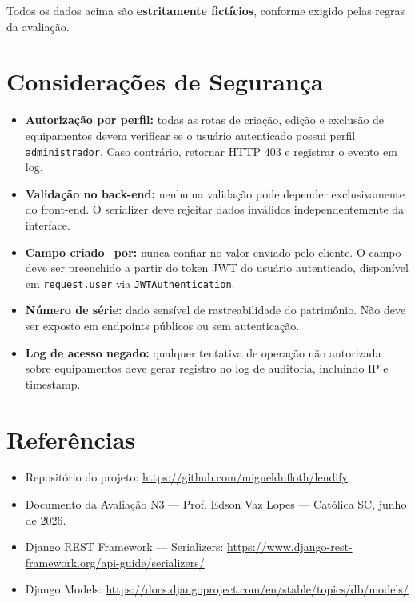 \documentclass[12pt,a4paper]{article}
\begin{document}
Todos os dados acima são \textbf{estritamente fictícios}, conforme exigido pelas
regras da avaliação.

\section{Considerações de Segurança}

\begin{itemize}
  \item \textbf{Autorização por perfil:} todas as rotas de criação, edição e exclusão
        de equipamentos devem verificar se o usuário autenticado possui perfil
        \texttt{administrador}. Caso contrário, retornar HTTP 403 e registrar o evento em log.

  \item \textbf{Validação no back-end:} nenhuma validação pode depender exclusivamente
        do front-end. O serializer deve rejeitar dados inválidos independentemente
        da interface.

  \item \textbf{Campo criado\_por:} nunca confiar no valor enviado pelo cliente.
        O campo deve ser preenchido a partir do token JWT do usuário autenticado,
        disponível em \texttt{request.user} via \texttt{JWTAuthentication}.

  \item \textbf{Número de série:} dado sensível de rastreabilidade do patrimônio.
        Não deve ser exposto em endpoints públicos ou sem autenticação.

  \item \textbf{Log de acesso negado:} qualquer tentativa de operação não autorizada
        sobre equipamentos deve gerar registro no log de auditoria, incluindo IP
        e timestamp.
\end{itemize}

\section{Referências}

\begin{itemize}
  \item Repositório do projeto: \url{https://github.com/migueldufloth/lendify}
  \item Documento da Avaliação N3 — Prof. Edson Vaz Lopes — Católica SC, junho de 2026.
  \item Django REST Framework — Serializers: \url{https://www.django-rest-framework.org/api-guide/serializers/}
  \item Django Models: \url{https://docs.djangoproject.com/en/stable/topics/db/models/}
\end{itemize}
\end{document}
